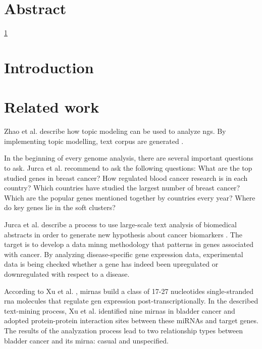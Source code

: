 





\chapter{Abstract}\label{abstract}
\ref{abstract}

\chapter{Introduction}\label{introduction}

\chapter{Related work}\label{related}

Zhao et al. \autocite{zhao_2016} describe how topic modeling can be used to analyze \gls{ngs}. By implementing topic modelling, text corpus are generated \autocite{zhao_2016}.

In the beginning of every genome analysis, there are several important questions to ask. Jurca et al. \autocite{jurca_2016} recommend to ask the following questions: What are the top studied genes in breast cancer? How regulated blood cancer research is in each country? Which countries have studied the largest number of breast cancer? Which are the popular genes mentioned together by countries every year? Where do key genes lie in the soft clusters?

Jurca et al. describe a process to use large-scale text analysis of biomedical abstracts in order to generate new hypothesis about cancer biomarkers \autocite{jurca_2016}. The target is to develop a data minng methodology that patterns in genes associated with cancer. By analyzing disease-specific gene expression data, experimental data is being checked whether a gene has indeed been upregulated or downregulated with respect to a disease.

According to Xu et al. \autocite{xu_2013}, \gls{mirna}s build a class of 17-27 nucleotides single-stranded \gls{rna} molecules that regulate gen expression post-transcriptionally. In the described text-mining process, Xu et al. identified nine \gls{mirna}s in bladder cancer and adopted protein-protein interaction sites between these miRNAs and target genes. The results of the analyzation process lead to two relationship types between bladder cancer and its \gls{mirna}: casual and unspecified. 

